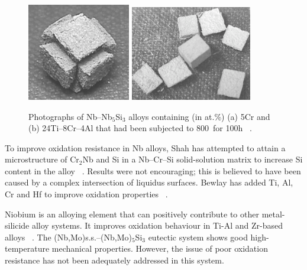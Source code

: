 %
\begin{figure}[H]
\begin{center}
\includegraphics[width=4.5cm]{zelenitsas}
\includegraphics[width=5.3cm]{zelenitsasii}
\vspace{-2mm}
\caption{ Photographs of Nb--Nb$_5$Si$_3$ alloys containing (in at.\%) (a) 5Cr and (b) 24Ti--8Cr--4Al that had been subjected to 800\celsius\ for 100h ~\cite{zelenitsas06}.}\label{fig:zelenitsas}
\end{center}
\end{figure}  
%

To improve oxidation resistance in Nb alloys, Shah has attempted to attain a microstructure of Cr$_2$Nb and Si in a Nb--Cr--Si solid-solution matrix to increase Si content in the alloy ~\cite{shah95}.  Results were not encouraging; this is believed to have been caused by a complex intersection of liquidus surfaces.  Bewlay has added Ti, Al, Cr and Hf to improve oxidation properties ~\cite{bewlay03}.

Niobium is an alloying element that can positively contribute to other metal-silicide alloy systems.  It improves oxidation behaviour in Ti-Al and Zr-based alloys ~\cite{zhan09}.  The (Nb,Mo)s.s.--(Nb,Mo)$_5$Si$_3$ eutectic system shows good high-temperature mechanical properties.  However, the issue of poor oxidation resistance has not been adequately addressed in this system.  


